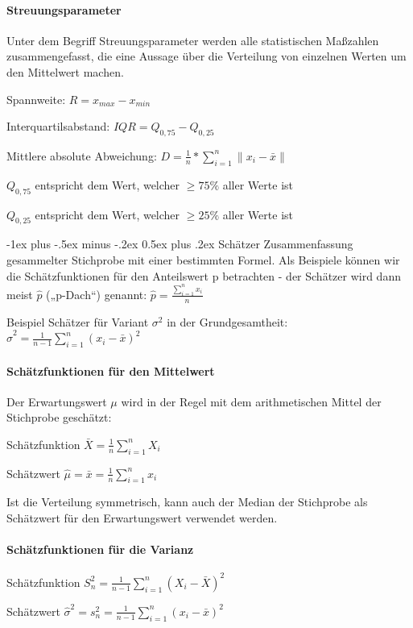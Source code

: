 \documentclass[a4paper]{article}
\makeatletter
\renewcommand{\section}{\@startsection{section}{1}{0mm}%
                                {-1ex plus -.5ex minus -.2ex}%
                                {0.5ex plus .2ex}%
                                {\normalfont\large\bfseries}}
\makeatother
\begin{document}
\begin{multicols}{3}
  \paragraph{Streuungsparameter}
  Unter dem Begriff Streuungsparameter werden alle statistischen Maßzahlen zusammengefasst, die eine Aussage über die Verteilung von einzelnen Werten um den Mittelwert machen.
  \begin{itemize*}
    \item Spannweite: $R=x_{max}-x_{min}$
    \item Interquartilsabstand: $IQR=Q_{0,75}-Q_{0,25}$
    \item Mittlere absolute Abweichung: $D=\frac{1}{n} * \sum_{i=1}^{n} \|x_i-\bar{x}\|$
    \item $Q_{0,75}$ entspricht dem Wert, welcher $\geq 75\%$ aller Werte ist
    \item $Q_{0,25}$ entspricht dem Wert, welcher $\geq 25\%$ aller Werte ist
  \end{itemize*}

  \section{Schätzer}
  Zusammenfassung gesammelter Stichprobe mit einer bestimmten Formel. 
  Als Beispiele können wir die Schätzfunktionen für den Anteilswert p betrachten - der Schätzer wird dann meist $\hat{p}$ („p-Dach“) genannt: $\hat{p}=\frac{\sum_{i=1}^n x_i}{n}$

  Beispiel Schätzer für Variant $\sigma^2$ in der Grundgesamtheit: $\hat{\sigma}^2=\frac{1}{n-1}\sum_{i=1}^n (x_i - \bar{x})^2$

  \paragraph{ Schätzfunktionen für den Mittelwert}
  Der Erwartungswert $\mu$ wird in der Regel mit dem arithmetischen Mittel der Stichprobe geschätzt:
  \begin{itemize*}
    \item Schätzfunktion $\bar{X}=\frac{1}{n}\sum_{i=1}^n X_i$
    \item Schätzwert $\hat{\mu}=\bar{x}=\frac{1}{n}\sum_{i=1}^n x_i$
  \end{itemize*}
  Ist die Verteilung symmetrisch, kann auch der Median der Stichprobe als Schätzwert für den Erwartungswert verwendet werden.

  \paragraph{ Schätzfunktionen für die Varianz}
  \begin{itemize*}
    \item Schätzfunktion $S_n^2= \frac{1}{n-1} \sum_{i=1}^n (X_i-\bar{X})^2$
    \item Schätzwert $\hat{\sigma}^2=s_n^2=\frac{1}{n-1}\sum_{i=1}^n (x_i-\bar{x})^2$
  \end{itemize*}


\end{multicols}
\end{document}
